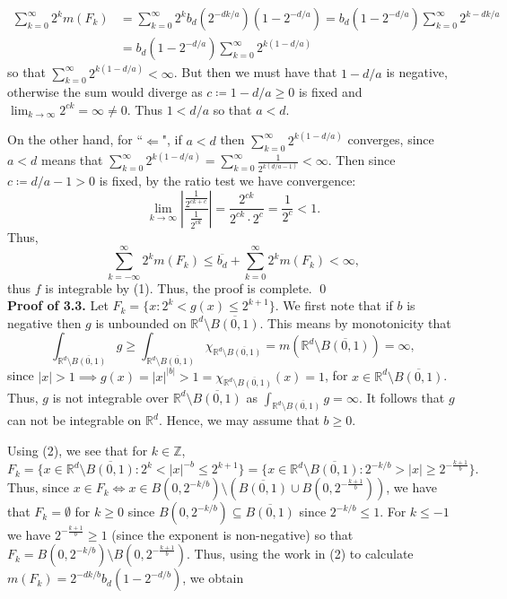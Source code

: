 \begin{align*}
	\sum_{k=0}^{\infty} 2^{k} m(F_{k} ) &= \sum_{k=0}^{\infty}2^{k} b_{d} (2^{-dk/a} )(1 - 2^{-d/a} ) = b_{d}(1-2^{-d/a} ) \sum_{k=0}^{\infty}2^{k - dk/a} \\
					    &= b_{d}(1-2^{-d/a} ) \sum_{k=0}^{\infty} 2^{k(1 - d/a)} 
\end{align*}
so that \( \sum_{k=0}^{\infty}2^{k(1 - d / a)} < \infty \). But then we must have that \( 1 - d/a  \) is negative, otherwise the sum would diverge as \(c\coloneqq 1 - d/a  \geq 0\) is fixed and \( \lim_{{k} \to {\infty}} 2^{ck} = \infty \neq 0 \). Thus \( 1 < d / a \) so that \( a < d \). 

On the other hand, for ``$\Leftarrow$", if \( a < d \) then \( \sum_{k = 0}^{\infty} 2^{k(1 - d / a)}  \) converges, since \( a < d \) means that \( \sum_{k= 0 }^{\infty} 2^{k(1 - d/a)} = \sum_{k=0}^{\infty}\frac{1}{2^{k (d / a - 1)}}  < \infty \). Then since \( c\coloneqq d/a - 1 > 0 \) is fixed, by the ratio test we have convergence: \[\lim_{{k} \to {\infty}} \left | \frac{\frac{1}{2^{ck + c} } }{\frac{1}{2^{ck} } } \right | = \frac{2^{ck} }{2^{ck} \cdot 2^{c} } = \frac{1}{2^{c} } < 1. \] Thus, \[ \sum_{k = -\infty}^{\infty}2^{k} m(F_{k} ) \leq \overline{b_{d} }+\sum_{k = 0 }^{\infty}2^{k}m(F_{k} ) < \infty   ,\] thus \( f \) is integrable by (1). Thus, the proof is complete. \qed \\

\noindent \textbf{Proof of 3.3.}
Let \( F_{k} = \{ x : 2^{k} < g(x) \leq 2^{k+1}  \}  \). We first note that if \( b \) is negative then \( g \) is unbounded on \( \mathbb{R}^{d} \setminus \overline{B(0,1)} \). This means by monotonicity that \[ \int_{\mathbb{R}^{d} \setminus \overline{B(0,1)}} g \geq \int_{\mathbb{R}^{d} \setminus \overline{B(0,1)}} \chi_{\mathbb{R}^{d} \setminus \overline{B(0,1)}}   = m(\mathbb{R}^{d} \setminus \overline{B(0,1)}) =\infty, \] since \( |x| > 1 \implies g(x) = |x|^{|b|} > 1 = \chi_{\mathbb{R}^d\setminus \overline{B(0,1)}} (x) = 1 \), for \( x \in \mathbb{R}^{d} \setminus \overline{B(0,1)} \). Thus, \( g \) is not integrable over \( \mathbb{R}^{d} \setminus \overline{B(0,1)} \) as \( \int_{\mathbb{R}^{d} \setminus \overline{B(0,1)}} g = \infty \). It follows that \( g \) can not be integrable on \( \mathbb{R}^{d} \). Hence, we may assume that \( b \geq 0 \).

Using (2), we see that for \( k \in \mathbb{Z}  \), \[ F_{k} = \{ x \in \mathbb{R}^{d} \setminus \overline{B(0,1)}  : 2^{k} < |x|^{-b} \leq 2^{k+1}  \} = \{ x \in \mathbb{R}^{d} \setminus \overline{B(0,1)}  : 2^{-k/b} > |x| \geq 2^{-\frac{k+1}{b} }  \}  .\] Thus, since \( x \in F_{k} \iff x \in B(0, 2^{-k / b} ) \setminus (\overline{B(0,1)}\cup B(0, 2^{-\frac{k+1}{b} } )) \), we have that \( F_{k} = \emptyset  \) for \( k \geq 0 \) since \( B(0, 2^{-k/b} ) \subseteq \overline{B(0,1)} \) since \( 2^{-k/b} \leq 1 \). For \( k \leq -1 \) we have \( 2^{-\frac{k+1}{b} } \geq 1 \) (since the exponent is non-negative) so that \( F_{k} = B(0, 2^{-k / b }) \setminus B(0, 2^{- \frac{k+1}{b} } ) \). Thus, using the work in (2) to calculate \( m(F_k) = 2^{-dk/b} b_{d} (1 - 2^{-d/b} )\), we obtain



